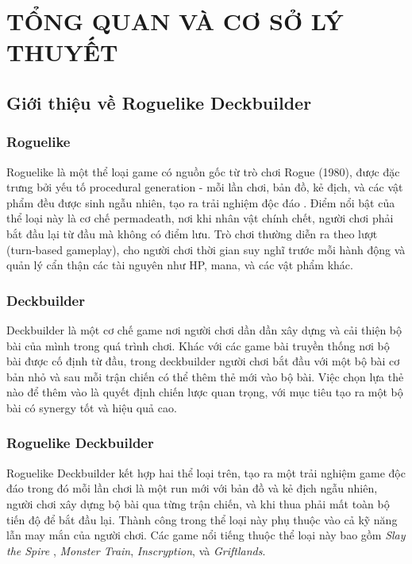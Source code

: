 \clearpage
{}
\chapter{TỔNG QUAN VÀ CƠ SỞ LÝ THUYẾT}

\section{Giới thiệu về Roguelike Deckbuilder}

\subsection{Roguelike}

Roguelike là một thể loại game có nguồn gốc từ trò chơi Rogue (1980), được đặc trưng bởi yếu tố procedural generation - mỗi lần chơi, bản đồ, kẻ địch, và các vật phẩm đều được sinh ngẫu nhiên, tạo ra trải nghiệm độc đáo \cite{dormans2011level}. Điểm nổi bật của thể loại này là cơ chế permadeath, nơi khi nhân vật chính chết, người chơi phải bắt đầu lại từ đầu mà không có điểm lưu. Trò chơi thường diễn ra theo lượt (turn-based gameplay), cho người chơi thời gian suy nghĩ trước mỗi hành động và quản lý cẩn thận các tài nguyên như HP, mana, và các vật phẩm khác.

\subsection{Deckbuilder}

Deckbuilder là một cơ chế game nơi người chơi dần dần xây dựng và cải thiện bộ bài của mình trong quá trình chơi. Khác với các game bài truyền thống nơi bộ bài được cố định từ đầu, trong deckbuilder người chơi bắt đầu với một bộ bài cơ bản nhỏ và sau mỗi trận chiến có thể thêm thẻ mới vào bộ bài. Việc chọn lựa thẻ nào để thêm vào là quyết định chiến lược quan trọng, với mục tiêu tạo ra một bộ bài có synergy tốt và hiệu quả cao.

\subsection{Roguelike Deckbuilder}

Roguelike Deckbuilder kết hợp hai thể loại trên, tạo ra một trải nghiệm game độc đáo trong đó mỗi lần chơi là một run mới với bản đồ và kẻ địch ngẫu nhiên, người chơi xây dựng bộ bài qua từng trận chiến, và khi thua phải mất toàn bộ tiến độ để bắt đầu lại. Thành công trong thể loại này phụ thuộc vào cả kỹ năng lẫn may mắn của người chơi. Các game nổi tiếng thuộc thể loại này bao gồm \textit{Slay the Spire} \cite{slaythespire}, \textit{Monster Train}, \textit{Inscryption}, và \textit{Griftlands}.

